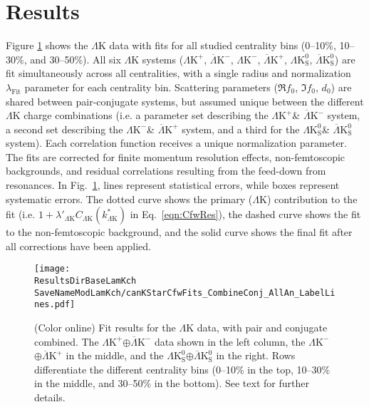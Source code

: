 \documentclass[ALICE,manyauthors]{cernphprep}
\newcommand{\ResultsDirBaseLamKch}{/home/jesse/Analysis/FemtoAnalysis/Results/Results_cLamcKch_20190319/}
\newcommand{\ResultsDirBaseLamKs}{/home/jesse/Analysis/FemtoAnalysis/Results/Results_cLamK0_20190319/}
\newcommand{\MomRes}{_MomResCrctn}%
\newcommand{\NonFlatBgdLamKch}{_NonFlatBgdCrctnLamK0LamKchPolynomial}
\newcommand{\NonFlatBgdLamKs}{_NonFlatBgdCrctnLamK0LamKchPolynomial}
\newcommand{\ResNum}{_3Res}
\newcommand{\PrimMaxDecay}{_PrimMaxDecay10fm}
\newcommand{\ResMethod}{_UsingXiDataAndCoulombOnly}
\newcommand{\ParamFixAndShareLamKch}{_ShareLam_Dualie_ShareLam_ShareRadii}
\newcommand{\ParamFixAndShareLamKs}{_ShareLam_Dualie_ShareLam_ShareRadii}
\newcommand{\SaveNameModLamKch}{\MomRes\NonFlatBgdLamKch\ResNum\PrimMaxDecay\ResMethod\ParamFixAndShareLamKch}
\newcommand{\SaveNameModLamKs}{\MomRes\NonFlatBgdLamKs\ResNum\PrimMaxDecay\ResMethod\ParamFixAndShareLamKs}
\newcommand{\LamK}{$\Lambda$K\xspace}
\newcommand{\LamKchP}{$\Lambda\mathrm{K^{+}}$\xspace}
\newcommand{\ALamKchM}{$\overline{\Lambda}\mathrm{K^{-}}$\xspace}
\newcommand{\LamKchM}{$\Lambda\mathrm{K^{-}}$\xspace}
\newcommand{\ALamKchP}{$\overline{\Lambda}\mathrm{K^{+}}$\xspace}
\newcommand{\LamKs}{$\Lambda\mathrm{K^{0}_{S}}$\xspace}
\newcommand{\ALamKs}{$\overline{\Lambda}\mathrm{K^{0}_{S}}$\xspace}
\begin{document}
\section{Results}
\label{sec:Results}

Figure \ref{fig:LamKFits_3Res} shows the \LamK data with fits for all studied centrality bins (0--10\%, 10--30\%, and 30--50\%). 
All six \LamK systems (\LamKchP, \ALamKchM, \LamKchM, \ALamKchP, \LamKs, \ALamKs) are fit simultaneously across all centralities, with a single radius and normalization $\lambda_{\mathrm{Fit}}$ parameter for each centrality bin.
Scattering parameters ($\Re f_{0}$, $\Im f_{0}$, $d_{0}$) are shared between pair-conjugate systems, but assumed unique between the different \LamK charge combinations (i.e. a parameter set describing the \LamKchP \& \ALamKchM system, a second set describing the \LamKchM \& \ALamKchP system, and a third for the \LamKs \& \ALamKs system).
Each correlation function receives a unique normalization parameter.
The fits are corrected for finite momentum resolution effects, non-femtoscopic backgrounds, and residual correlations resulting from the feed-down from resonances.
In Fig.\ \ref{fig:LamKFits_3Res}, lines represent statistical errors, while boxes represent systematic errors.  
The dotted curve shows the primary (\LamK) contribution to the fit (i.e. $1 + \lambda'_{\Lambda\mathrm{K}}C_{\Lambda\mathrm{K}}(k^{*}_{\Lambda\mathrm{K}})$ in Eq.\ \ref{eqn:CfwRes}), the dashed curve shows the fit to the non-femtoscopic background, and the solid curve shows the final fit{\color{blue}{, with all residual contributions included and}} after all corrections have been applied.
{\color{blue}{The extraction of the primary \LamK component is the purpose of this study.
The figure demonstrates that the final fit function is similar to the primary \LamK component, with the largest differences between the two observed in the 30-50\% centrality bin due mainly to the large contribution of the non-femtoscopic background.}}

\begin{figure}[h!]
  \centering
  \texttt{[image: \\ResultsDirBaseLamKch\\SaveNameModLamKch/canKStarCfwFits\_CombineConj\_AllAn\_LabelLines.pdf]}
  \caption[\LamK data with fits]
  {
  (Color online) Fit results for the \LamK data, with pair and conjugate combined.
  The \LamKchP$\oplus$\ALamKchM data {\color{red}{is}} {\color{blue}{are}} shown in the left column, the \LamKchM$\oplus$\ALamKchP in the middle, and the \LamKs$\oplus$\ALamKs in the right. 
  Rows differentiate the different centrality bins (0--10\% in the top, 10--30\% in the middle, and 30--50\% in the bottom).
  See text for further details.
 }
  \label{fig:LamKFits_3Res}
\end{figure}
\end{document}
